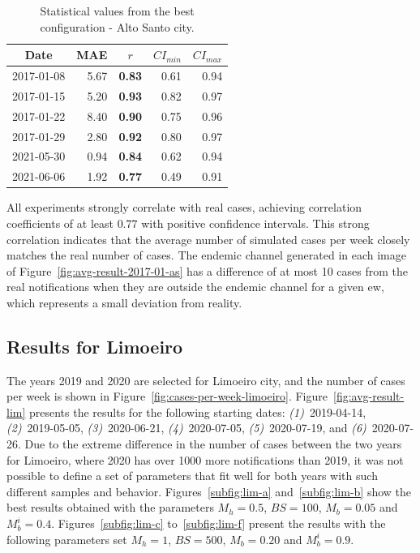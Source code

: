 \begin{table}[!ht]
\centering
\caption{Statistical values from the best configuration - Alto Santo city.}
\label{tab:statistical-data-as}
\small{%
\begin{tabular}{lrrrr}
\toprule
  \multicolumn{1}{c}{\textbf{Date}} &
  \multicolumn{1}{c}{\textbf{MAE}} &
  \multicolumn{1}{c}{\textbf{$r$}} &
  \multicolumn{1}{c}{\textbf{$CI_{min}$}} &
  \multicolumn{1}{c}{\textbf{$CI_{max}$}} \\ \midrule
2017-01-08 & 5.67  & \textbf{0.83} & 0.61  & 0.94 \\
2017-01-15 & 5.20  & \textbf{0.93} & 0.82  & 0.97 \\
2017-01-22 & 8.40  & \textbf{0.90}  & 0.75  & 0.96 \\
2017-01-29 & 2.80  & \textbf{0.92} & 0.80  & 0.97 \\
2021-05-30 & 0.94  & \textbf{0.84} & 0.62  & 0.94 \\
2021-06-06 & 1.92  & \textbf{0.77} & 0.49  & 0.91 \\ \bottomrule
\end{tabular}%
}
\end{table}

All experiments strongly correlate with real cases, achieving correlation coefficients of at least $0.77$ with positive confidence intervals. This strong correlation indicates that the average number of simulated cases per week closely matches the real number of cases. The endemic channel generated in each image of Figure~\ref{fig:avg-result-2017-01-as} has a difference of at most 10 cases from the real notifications when they are outside the endemic channel for a given \gls{ew}, which represents a small deviation from reality.

\subsection{Results for Limoeiro}\label{subsec:results-limoeiro}

The years 2019 and 2020 are selected for Limoeiro city, and the number of cases per week is shown in Figure~\ref{fig:cases-per-week-limoeiro}. 
Figure~\ref{fig:avg-result-lim} presents the results for the following starting dates: \textit{(1)}~2019-04-14, \textit{(2)}~2019-05-05, \textit{(3)}~2020-06-21, \textit{(4)}~2020-07-05, \textit{(5)}~2020-07-19, and \textit{(6)}~2020-07-26. 
Due to the extreme difference in the number of cases between the two years for Limoeiro, where 2020 has over 1000 more notifications than 2019, it was not possible to define a set of parameters that fit well for both years with such different samples and behavior.
Figures~\ref{subfig:lim-a} and~\ref{subfig:lim-b} show the best results obtained with the parameters $M_h = 0.5$, $BS = 100$, $M_b = 0.05$ and $M_b^{i} = 0.4$. Figures~\ref{subfig:lim-c} to~\ref{subfig:lim-f} present the results with the following parameters set $M_h = 1$, $BS = 500$, $M_b = 0.20$ and $M_b^{i} = 0.9$.

